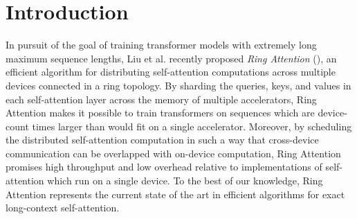 \title{}

\begin{abstract}
To help address the growing demand for ever-longer sequence lengths in transformer models, Liu et al. recently proposed Ring Attention (\citeyear{liu2023ring}), an exact attention algorithm capable of overcoming per-device memory bottlenecks by distributing self-attention across multiple devices. In this paper, we study the performance characteristics of Ring Attention in the important special case of \emph{causal} transformer models, and identify a key workload imbalance due to triangular structure of causal attention computations. We propose a simple extension to Ring Attention, which we call \emph{Striped Attention} to fix this imbalance. Instead of devices having contiguous subsequences, each device has a subset of tokens distributed uniformly throughout the sequence, which we demonstrate leads to more even workloads. In experiments running Striped Attention on A100 GPUs and TPUv4s, we are able to achieve up to $1.45\times$ end-to-end throughput improvements over the original Ring Attention algorithm on causal transformer training at a sequence length of 256k. Furthermore, on 16 TPUv4 chips, we were able to achieve $1.65\times$ speedups at sequence lengths of 786k. We release the code for our experiments as open source.
\end{abstract}

\section{Introduction}

In pursuit of the goal of training transformer models \cite{transformer} with extremely long maximum sequence lengths, Liu et al. recently proposed \emph{Ring Attention} (\citeyear{liu2023ring}), an efficient algorithm for distributing self-attention computations across multiple devices connected in a ring topology. By sharding the queries, keys, and values in each self-attention layer across the memory of multiple accelerators, Ring Attention makes it possible to train transformers on sequences which are device-count times larger than would fit on a single accelerator. Moreover, by scheduling the distributed self-attention computation in such a way that cross-device communication can be overlapped with on-device computation, Ring Attention promises high throughput and low overhead relative to implementations of self-attention which run on a single device. To the best of our knowledge, Ring Attention represents the current state of the art in efficient algorithms for exact long-context self-attention.

